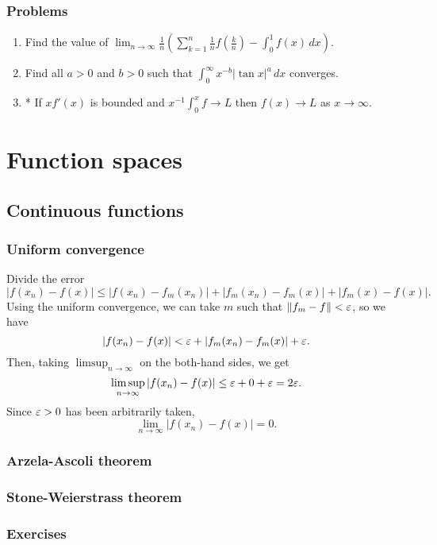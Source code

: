 \documentclass{../../large}
\begin{document}
\section*{Problems}
\begin{enumerate}
\item Find the value of $\lim_{n\to\infty}\frac1n\left(\sum_{k=1}^n\frac1nf\left(\frac kn\right)-\int_0^1f(x)\,dx\right)$.
\item Find all $a>0$ and $b>0$ such that $\int_0^\infty x^{-b}|\tan x|^a\,dx$ converges.
\item* If $xf'(x)$ is bounded and $x^{-1}\int_0^xf\to L$ then $f(x)\to L$ as $x\to\infty$.
\end{enumerate}









\part{Function spaces}

\chapter{Continuous functions}
\section{Uniform convergence}
\begin{pf}
Divide the error
\[|f(x_n)-f(x)|\le|f(x_n)-f_m(x_n)|+|f_m(x_n)-f_m(x)|+|f_m(x)-f(x)|.\]
Using the uniform convergence, we can take $m$ such that $\|f_m-f\|<\varepsilon$, so we have
\[|f(x_n)-f(x)|<\varepsilon+|f_m(x_n)-f_m(x)|+\varepsilon.\]
Then, taking $\limsup_{n\to\infty}$ on the both-hand sides, we get
\[\limsup_{n\to\infty}|f(x_n)-f(x)|\le\varepsilon+0+\varepsilon=2\varepsilon.\]
Since $\varepsilon>0$ has been arbitrarily taken,
\[\lim_{n\to\infty}|f(x_n)-f(x)|=0.\]
\end{pf}

\section{Arzela-Ascoli theorem}
\section{Stone-Weierstrass theorem}

\section*{Exercises}
\begin{prb}
\end{prb}
\end{document}
